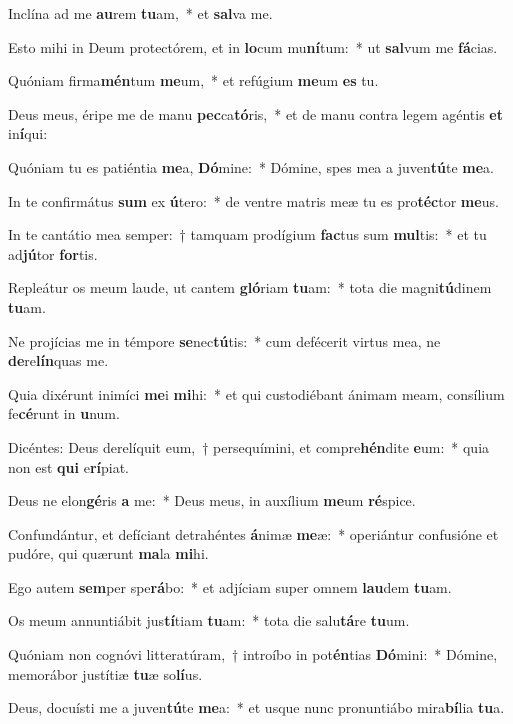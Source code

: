 \item Inclína ad me \textbf{au}rem \textbf{tu}am,~* et \textbf{sal}va me.
\item Esto mihi in Deum protectórem, et in \textbf{lo}cum mu\textbf{ní}tum:~* ut \textbf{sal}vum me \textbf{fá}cias.
\item Quóniam firma\textbf{mén}tum \textbf{me}um,~* et refúgium \textbf{me}um \textbf{es} tu.
\item Deus meus, éripe me de manu \textbf{pec}ca\textbf{tó}ris,~* et de manu contra legem agéntis \textbf{et} in\textbf{í}qui:
\item Quóniam tu es patiéntia \textbf{me}a, \textbf{Dó}mine:~* Dómine, spes mea a juven\textbf{tú}te \textbf{me}a.
\item In te confirmátus \textbf{sum} ex \textbf{ú}tero:~* de ventre matris meæ tu es pro\textbf{téc}tor \textbf{me}us.
\item In te cantátio mea semper:~† tamquam prodígium \textbf{fac}tus sum \textbf{mul}tis:~* et tu ad\textbf{jú}tor \textbf{for}tis.
\item Repleátur os meum laude, ut cantem \textbf{gló}riam \textbf{tu}am:~* tota die magni\textbf{tú}dinem \textbf{tu}am.
\item Ne projícias me in témpore \textbf{se}nec\textbf{tú}tis:~* cum defécerit virtus mea, ne \textbf{de}re\textbf{lín}quas me.
\item Quia dixérunt inimíci \textbf{me}i \textbf{mi}hi:~* et qui custodiébant ánimam meam, consílium fe\textbf{cé}runt in \textbf{u}num.
\item Dicéntes: Deus derelíquit eum,~† persequímini, et compre\textbf{hén}dite \textbf{e}um:~* quia non est \textbf{qui} e\textbf{rí}piat.
\item Deus ne elon\textbf{gé}ris \textbf{a} me:~* Deus meus, in auxílium \textbf{me}um \textbf{ré}spice.
\item Confundántur, et defíciant detrahéntes \textbf{á}nimæ \textbf{me}æ:~* operiántur confusióne et pudóre, qui quærunt \textbf{ma}la \textbf{mi}hi.
\item Ego autem \textbf{sem}per spe\textbf{rá}bo:~* et adjíciam super omnem \textbf{lau}dem \textbf{tu}am.
\item Os meum annuntiábit jus\textbf{tí}tiam \textbf{tu}am:~* tota die salu\textbf{tá}re \textbf{tu}um.
\item Quóniam non cognóvi litteratúram,~† introíbo in pot\textbf{én}tias \textbf{Dó}mini:~* Dómine, memorábor justítiæ \textbf{tu}æ so\textbf{lí}us.
\item Deus, docuísti me a juven\textbf{tú}te \textbf{me}a:~* et usque nunc pronuntiábo mira\textbf{bí}lia \textbf{tu}a.
